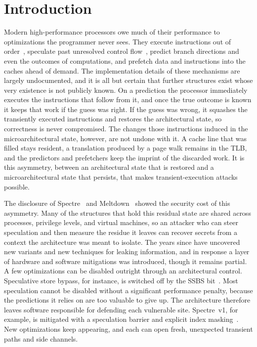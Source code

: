 \chapter{Introduction}
\label{chap:intro}

Modern high-performance processors owe much of their performance to optimizations the
programmer never sees. They execute instructions out of order~\cite{tomasulo,hennessy_patterson},
speculate past unresolved control flow~\cite{smith_bpred}, predict branch directions and even
the outcomes of computations, and prefetch data and instructions into the caches ahead of
demand. The implementation details of these mechanisms are largely undocumented, and it is
all but certain that further structures exist whose very existence is not publicly known. On a
prediction the processor immediately executes the instructions that follow from it, and once
the true outcome is known it keeps that work if the guess was right. If the guess was wrong,
it squashes the transiently executed instructions and restores the architectural state, so
correctness is never compromised. The changes those instructions induced in the
microarchitectural state, however, are not undone with it. A cache line that was filled stays
resident, a translation produced by a page walk remains in the TLB, and the predictors and
prefetchers keep the imprint of the discarded work. It is this asymmetry, between an
architectural state that is restored and a microarchitectural state that persists, that makes
transient-execution attacks possible.

The disclosure of Spectre~\cite{spectre} and Meltdown~\cite{meltdown} showed the security
cost of this asymmetry. Many of the structures that hold this residual state are shared
across processes, privilege levels, and virtual machines, so an attacker who can steer
speculation and then measure the residue it leaves can recover secrets from a context the
architecture was meant to isolate. The years since have uncovered new variants and new
techniques for leaking information, and in response a layer of hardware and software
mitigations was introduced, though it remains partial. A few optimizations can be disabled
outright through an architectural control. Speculative store bypass, for instance, is
switched off by the SSBS bit~\cite{arm_ssbs}. Most speculation cannot be disabled without a
significant performance penalty, because the predictions it relies on are too valuable to
give up. The architecture therefore leaves software responsible for defending each
vulnerable site. Spectre~v1, for example, is mitigated with a speculation barrier and
explicit index masking~\cite{spectre}. New optimizations keep appearing, and each can open
fresh, unexpected transient paths and side channels.

